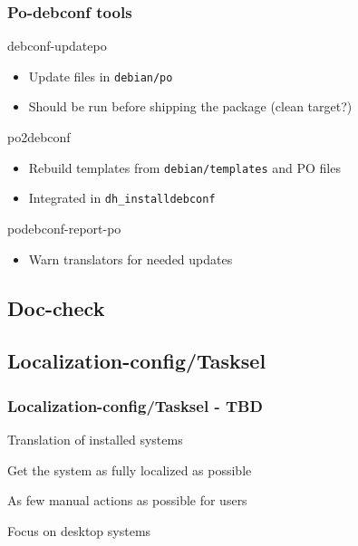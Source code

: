 \documentclass{beamer}
\begin{document}
\begin{frame}
  \frametitle{Po-debconf tools}
	\begin{block}
		{debconf-updatepo}
		\begin{itemize}
		\item
			{Update files in \texttt{debian/po}}
		\item
			Should be run before shipping the package (clean target?)
		\end{itemize}
	\end{block}
	\begin{block}
		{po2debconf}
		\begin{itemize}
		\item
			Rebuild templates from \texttt{debian/templates} and PO files
		\item
			Integrated in \texttt{dh\_installdebconf}
		\end{itemize}
	\end{block}
	\begin{block}
		{podebconf-report-po}
		\begin{itemize}
		\item
			Warn translators for needed updates
		\end{itemize}
	\end{block}
\end{frame}


\subsection{Doc-check}

\begin{frame}
  \frametitle{}
\end{frame}

\begin{frame}
  \frametitle{}
\end{frame}

\begin{frame}
  \frametitle{}
\end{frame}

\subsection{Localization-config/Tasksel}

\begin{frame}
  \frametitle{Localization-config/Tasksel - TBD}
	\begin{block}
		{Translation of installed systems}
	\end{block}
	\begin{block}
		{Get the system as fully localized as possible}
	\end{block}
	\begin{block}
		{As few manual actions as possible for users}
	\end{block}
	\begin{block}
		{Focus on desktop systems}
	\end{block}
\end{frame}
\end{document}
